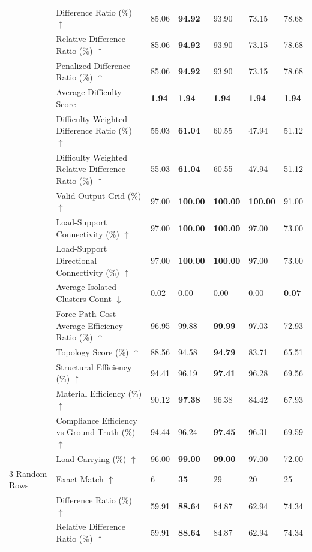 \begin{table}[!h]
{\begin{tabular}{lllllll}
 & Difference Ratio (\%) $\uparrow$ & 85.06 & \textbf{94.92} & 93.90 & 73.15 & 78.68 \\
 & Relative Difference Ratio (\%) $\uparrow$ & 85.06 & \textbf{94.92} & 93.90 & 73.15 & 78.68 \\
 & Penalized Difference Ratio (\%) $\uparrow$ & 85.06 & \textbf{94.92} & 93.90 & 73.15 & 78.68 \\
 & Average Difficulty Score & \textbf{1.94} & \textbf{1.94} & \textbf{1.94} & \textbf{1.94} & \textbf{1.94} \\
 & Difficulty Weighted Difference Ratio (\%) $\uparrow$ & 55.03 & \textbf{61.04} & 60.55 & 47.94 & 51.12 \\
 & Difficulty Weighted Relative Difference Ratio (\%) $\uparrow$ & 55.03 & \textbf{61.04} & 60.55 & 47.94 & 51.12 \\
 & Valid Output Grid (\%) $\uparrow$ & 97.00 & \textbf{100.00} & \textbf{100.00} & \textbf{100.00} & 91.00 \\
 & Load-Support Connectivity (\%) $\uparrow$ & 97.00 & \textbf{100.00} & \textbf{100.00} & 97.00 & 73.00 \\
 & Load-Support Directional Connectivity (\%) $\uparrow$ & 97.00 & \textbf{100.00} & \textbf{100.00} & 97.00 & 73.00 \\
 & Average Isolated Clusters Count $\downarrow$ & 0.02 & 0.00 & 0.00 & 0.00 & \textbf{0.07} \\
 & Force Path Cost Average Efficiency Ratio (\%) $\uparrow$ & 96.95 & 99.88 & \textbf{99.99} & 97.03 & 72.93 \\
 & Topology Score (\%) $\uparrow$ & 88.56 & 94.58 & \textbf{94.79} & 83.71 & 65.51 \\
 & Structural Efficiency (\%) $\uparrow$ & 94.41 & 96.19 & \textbf{97.41} & 96.28 & 69.56 \\
 & Material Efficiency (\%) $\uparrow$ & 90.12 & \textbf{97.38} & 96.38 & 84.42 & 67.93 \\
 & Compliance Efficiency vs Ground Truth (\%) $\uparrow$ & 94.44 & 96.24 & \textbf{97.45} & 96.31 & 69.59 \\
 & Load Carrying (\%) $\uparrow$ & 96.00 & \textbf{99.00} & \textbf{99.00} & 97.00 & 72.00 \\
3 Random Rows & Exact Match $\uparrow$ & 6 & \textbf{35} & 29 & 20 & 25 \\
 & Difference Ratio (\%) $\uparrow$ & 59.91 & \textbf{88.64} & 84.87 & 62.94 & 74.34 \\
 & Relative Difference Ratio (\%) $\uparrow$ & 59.91 & \textbf{88.64} & 84.87 & 62.94 & 74.34 \\

\end{tabular}}
\end{table}
